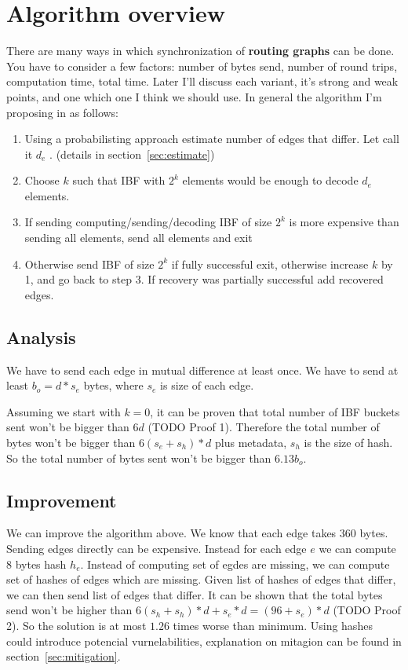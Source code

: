 \documentclass[11pt]{article}
\begin{document}
\section{Algorithm overview}
There are many ways in which synchronization of \textbf{routing graphs} can be done.
You have to consider a few factors: number of bytes send, number of round trips, computation time, total time.
Later I'll discuss each variant, it's strong and weak points, and one which one I think we should use.
In general the algorithm I'm proposing in as follows:
\begin{enumerate}
  \item Using a probabilisting approach estimate number of edges that differ. Let call it $d_e$ . (details in section~\ref{sec:estimate})
  \item Choose $k$ such that IBF with $2^k$ elements would be enough to decode $d_e$ elements.
  \item If sending computing/sending/decoding IBF of size $2^k$ is more expensive than sending all elements, send all elements and exit
  \item Otherwise send IBF of size $2^k$ if fully successful exit, otherwise increase $k$ by 1, and go back to step 3.
 If recovery was partially successful add recovered edges.
\end{enumerate}
\subsection{Analysis}
We have to send each edge in mutual difference at least once. 
We have to send at least $b_o = d*s_e$ bytes, where $s_e$ is size of each edge.

Assuming we start with $k=0$, it can be proven that total number of IBF buckets sent won't be bigger than $6d$  (TODO Proof 1).
Therefore the total number of bytes won't be bigger than $6(s_e+s_h)*d$ plus metadata, $s_h$ is the size of hash.
So the total number of bytes sent won't be bigger than $6.13b_o$.
\subsection{Improvement}
We can improve the algorithm above. We know that each edge takes 360 bytes. Sending edges directly can be expensive. Instead for each edge $e$ we can compute 8 bytes hash $h_e$.
Instead of computing set of egdes are missing, we can compute set of hashes of edges which are missing. Given list of hashes of edges that differ, we can then send list of edges that differ.
It can be shown that the total bytes send won't be higher than $6(s_h+s_h)*d + s_e * d = (96+s_e)*d$ (TODO Proof 2). So the solution is at most $1.26$ times worse than minimum.
Using hashes could introduce potencial vurnelabilities, explanation on mitagion can be found in section~\ref{sec:mitigation}.
\end{document}
